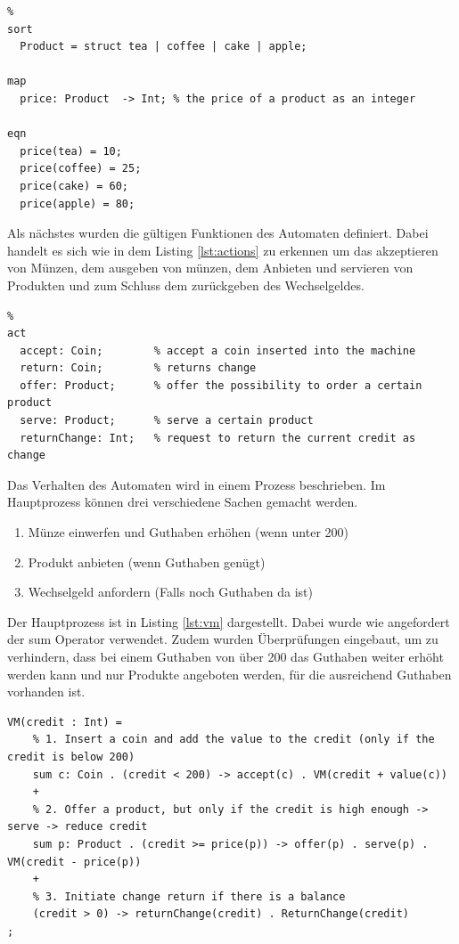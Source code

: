 \documentclass{article}
\begin{document}
\begin{lstlisting}[caption={Definition der Produkte},label={lst:produkte}]
% Definition of the products
%
sort
  Product = struct tea | coffee | cake | apple;

map
  price: Product  -> Int; % the price of a product as an integer

eqn
  price(tea) = 10;
  price(coffee) = 25;
  price(cake) = 60;
  price(apple) = 80;	
\end{lstlisting}

Als nächstes wurden die gültigen Funktionen des Automaten definiert. Dabei handelt es sich wie in dem Listing \ref{lst:actions} zu erkennen um das akzeptieren von Münzen, dem ausgeben von münzen, dem Anbieten und servieren von Produkten und zum Schluss dem zurückgeben des Wechselgeldes.

\begin{lstlisting}[caption={Definition der Funktionen},label={lst:actions}]
% Definition of the actions
%
act
  accept: Coin;        % accept a coin inserted into the machine    
  return: Coin;        % returns change
  offer: Product;      % offer the possibility to order a certain product
  serve: Product;      % serve a certain product
  returnChange: Int;   % request to return the current credit as  change
\end{lstlisting}

Das Verhalten des Automaten wird in einem Prozess beschrieben. Im Hauptprozess können drei verschiedene Sachen gemacht werden. 

\begin{enumerate}
	\item{Münze einwerfen und Guthaben erhöhen (wenn unter 200)}
	\item{Produkt anbieten (wenn Guthaben genügt)}
	\item{Wechselgeld anfordern (Falls noch Guthaben da ist)}
\end{enumerate}

Der Hauptprozess ist in Listing \ref{lst:vm} dargestellt. Dabei wurde wie angefordert der sum Operator verwendet. Zudem wurden Überprüfungen eingebaut, um zu verhindern, dass bei einem Guthaben von über 200 das Guthaben weiter erhöht werden kann und nur Produkte angeboten werden, für die ausreichend Guthaben vorhanden ist. 

\begin{lstlisting}[caption={Hauptprozess des Automaten},label={lst:vm}]
VM(credit : Int) =
	% 1. Insert a coin and add the value to the credit (only if the credit is below 200)
	sum c: Coin . (credit < 200) -> accept(c) . VM(credit + value(c))
	+
	% 2. Offer a product, but only if the credit is high enough -> serve -> reduce credit
	sum p: Product . (credit >= price(p)) -> offer(p) . serve(p) . VM(credit - price(p))
	+
	% 3. Initiate change return if there is a balance
	(credit > 0) -> returnChange(credit) . ReturnChange(credit)
;
\end{lstlisting}
\end{document}
